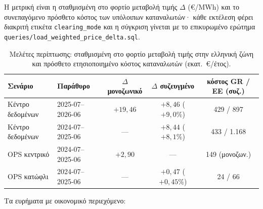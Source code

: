 Η μετρική είναι η σταθμισμένη στο φορτίο μεταβολή τιμής $\Delta$ (€/MWh) και το συνεπαγόμενο πρόσθετο κόστος των υπόλοιπων καταναλωτών· κάθε εκτέλεση φέρει διακριτή ετικέτα \texttt{clearing\_mode} και η σύγκριση γίνεται με το επικυρωμένο ερώτημα \texttt{queries/load\_weighted\_price\_delta.sql}.

\begin{table}[htbp]
\centering
\caption{Μελέτες περίπτωσης: σταθμισμένη στο φορτίο μεταβολή τιμής στην ελληνική ζώνη και πρόσθετο ετησιοποιημένο κόστος καταναλωτών (εκατ.~€/έτος).}
\label{tab:scenario-results}
\begin{tabular}{@{}llccc@{}}
\toprule
\textbf{Σενάριο} & \textbf{Παράθυρο} & \textbf{$\Delta$ μονοζωνικό} & \textbf{$\Delta$ συζευγμένο} & \textbf{κόστος GR / ΕΕ (συζ.)} \\
\midrule
Κέντρο δεδομένων & 2025-07--2026-06 & $+19{,}46$ & $+8{,}46$ ($+9{,}0\%$) & 429 / 897 \\
Κέντρο δεδομένων & 2024-07--2025-06 & --- & $+8{,}44$ ($+8{,}1\%$) & 433 / 1.168 \\
OPS κεντρικό & 2024-07--2025-06 & $+2{,}90$ & --- & 149 (μονοζων.) \\
OPS κατώφλι & 2024-07--2025-06 & --- & $+0{,}47$ ($+0{,}45\%$) & 24 / 66 \\
\bottomrule
\end{tabular}
\end{table}

Τα ευρήματα με οικονομικό περιεχόμενο:

